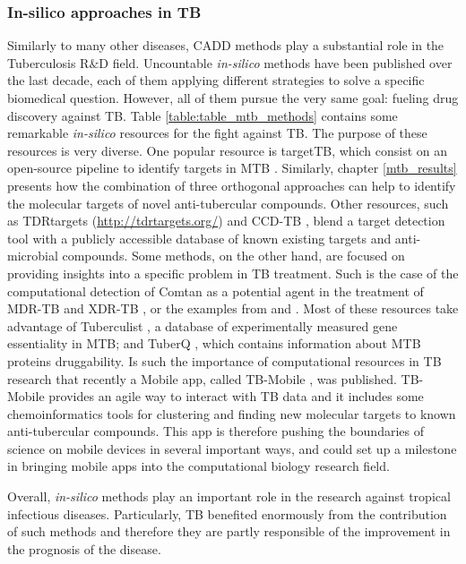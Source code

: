\documentclass[11pt, b5paper,twoside]{tesi_upf}
\begin{document}
\subsubsection{In-silico approaches in TB}

\par Similarly to many other diseases, CADD methods play a substantial role in the Tuberculosis R$\&$D field. Uncountable \textit{in-silico} methods have been published over the last decade, each of them applying different strategies to solve a specific biomedical question. However, all of them pursue the very same goal: fueling drug discovery against TB. Table \ref{table:table_mtb_methods} contains some remarkable \textit{in-silico} resources for the fight
against TB. The purpose of these resources is very diverse. One popular resource is targetTB, which consist on an open-source pipeline to identify targets in MTB \cite{Raman2008a}. Similarly, chapter \ref{mtb_results} presents how the combination of three orthogonal approaches can help to identify the molecular targets of novel anti-tubercular compounds. Other resources, such as TDRtargets \cite{Crowther2010} (\url{http://tdrtargets.org/}) and CCD-TB \cite{Ekins2010},  blend a target detection tool with a publicly accessible database of known existing targets and anti-microbial compounds. Some methods, on the other hand, are focused on providing insights into a specific problem in TB treatment. Such is the case of the computational detection of Comtan as a potential agent in the treatment of MDR-TB and XDR-TB \cite{Kinnings2009}, or the examples from \cite{DeJonge2007} and \cite{Kumar2009}. Most of these resources take advantage of Tuberculist \cite{Lew2011}, a database of experimentally measured gene essentiality in MTB; and TuberQ \cite{Radusky2014}, which contains information about MTB proteins druggability. Is such the importance of computational resources in TB research that recently a Mobile app, called TB-Mobile \cite{Ekins2013, Clark2014}, was published. TB-Mobile provides an agile way to interact with TB data and it includes some chemoinformatics tools for clustering and finding new molecular targets to known anti-tubercular compounds. This app is therefore pushing the boundaries of science on mobile devices in several important ways, and could set up a milestone in bringing mobile apps into the computational biology research field.

\par Overall, \textit{in-silico} methods play an important role in the research against tropical infectious diseases. Particularly, TB benefited enormously from the contribution of such methods and therefore they are partly responsible of the improvement in the prognosis of the disease. 
\end{document}

